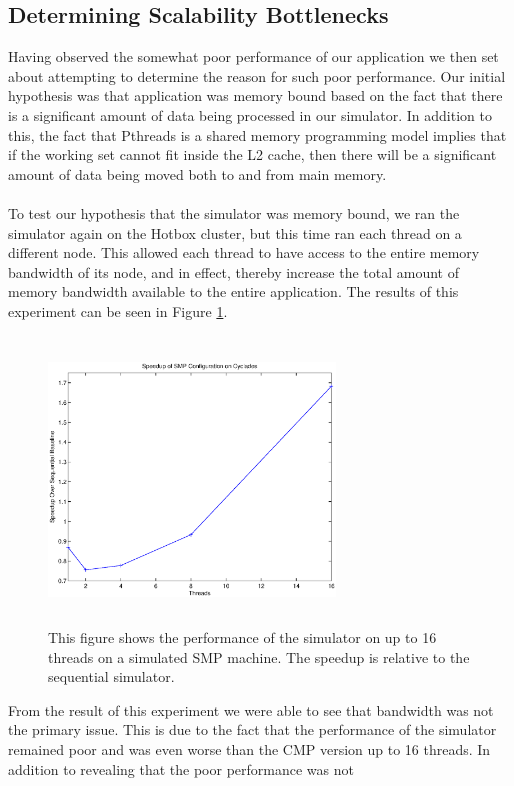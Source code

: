 \documentclass[twocolumn]{article}
\begin{document}
\subsection{Determining Scalability Bottlenecks}
Having observed the somewhat poor performance of our application we then
set about attempting to determine the reason for such poor performance.
Our initial hypothesis was that application was memory bound based on the
fact that there is a significant amount of data being processed in our
simulator.  In addition to this, the fact that Pthreads is a shared memory
programming model implies that if the working set cannot fit inside the L2
cache, then there will be a significant amount of data being moved both to
and from main memory.\\
~\\
To test our hypothesis that the simulator was memory bound, we ran the
simulator again on the Hotbox cluster, but this time ran each thread on a
different node.  This allowed each thread to have access to the entire
memory bandwidth of its node, and in effect, thereby increase the total
amount of memory bandwidth available to the entire application.  The
results of this experiment can be seen in Figure \ref{smp}.\\
\begin{figure}[h]
\centering
\includegraphics[height=3in,width=3in]{smp.eps}
\caption{\label{smp}This figure shows the performance of the simulator on
up to 16 threads on a simulated SMP machine.  The speedup is relative to
the sequential simulator.}
\end{figure}
From the result of this experiment we were able to see that bandwidth was
not the primary issue.  This is due to the fact that the performance of
the simulator remained poor and was even worse than the CMP version up to
16 threads.  In addition to revealing that the poor performance was not
\end{document}
